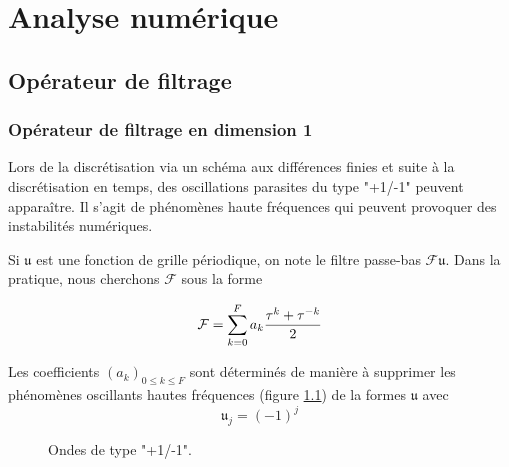 \chapter{Analyse numérique}

\section{Opérateur de filtrage }

\subsection{Opérateur de filtrage en dimension 1}

Lors de la discrétisation via un schéma aux différences finies et suite à la discrétisation en temps, des oscillations parasites du type "+1/-1" peuvent apparaître. Il s'agit de phénomènes haute fréquences qui peuvent provoquer des instabilités numériques. 

Si $\mathfrak{u}$ est une fonction de grille périodique, on note le filtre passe-bas $\mathcal{F}\mathfrak{u}$. Dans la pratique, nous cherchons $\mathcal{F}$ sous la forme 

\begin{equation}
\mathcal{F} = \displaystyle\sum\limits_{k=0}^F a_k \dfrac{\tau^k + \tau^{-k}}{2}
\label{eq:ftr}
\end{equation}

Les coefficients $(a_k)_{0 \leq k \leq F}$ sont déterminés de manière à supprimer les phénomènes oscillants hautes fréquences (figure \ref{fig:hf_waves}) de la formes $\mathfrak{u}$ avec 
\begin{equation}
\mathfrak{u}_j = (-1)^j
\end{equation}

\begin{figure}[htbp]
\begin{center}
\end{center}
\caption{Ondes de type "+1/-1".}
\label{fig:hf_waves}
\end{figure}


